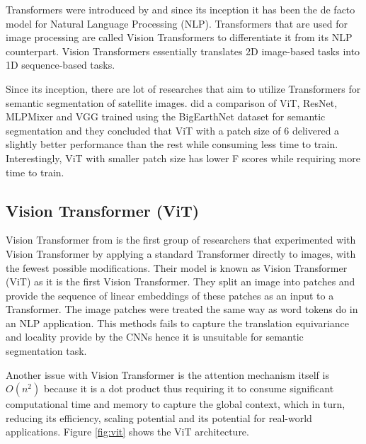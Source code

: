 Transformers were introduced by \cite{attention-is-all-you-need} and since its inception it has been the de facto model for Natural Language Processing (NLP). Transformers that are used for image processing are called Vision Transformers to differentiate it from its NLP counterpart. Vision Transformers essentially translates 2D image-based tasks into 1D sequence-based tasks.

Since its inception, there are lot of researches that aim to utilize Transformers for semantic segmentation of satellite images. 
\cite{benchmarking-scaling} did a comparison of ViT, ResNet, MLPMixer and VGG trained using the BigEarthNet dataset for semantic segmentation and they concluded that ViT with a patch size of 6 delivered a slightly better performance than the rest while consuming less time to train. Interestingly, ViT with smaller patch size has lower F scores while requiring more time to train.

\subsection{Vision Transformer (ViT)}
Vision Transformer from \cite{16x16} is the first group of researchers that experimented with Vision Transformer by applying a standard Transformer directly to images, with the fewest possible modifications. Their model is known as Vision Transformer (ViT) as it is the first Vision Transformer. They split an image into patches and provide the sequence of linear embeddings of these patches as an input to a Transformer. The image patches were treated the same way as word tokens do in an NLP application. This methods fails to capture the  translation equivariance and locality provide by the CNNs hence it is unsuitable for semantic segmentation task.

Another issue with Vision Transformer is the attention mechanism itself is $O(n^2)$ because it is a dot product thus requiring it to consume significant computational time and memory to capture the global context, which in turn, reducing its efficiency, scaling potential and its potential for real-world applications. Figure \ref{fig:vit} shows the ViT architecture.

